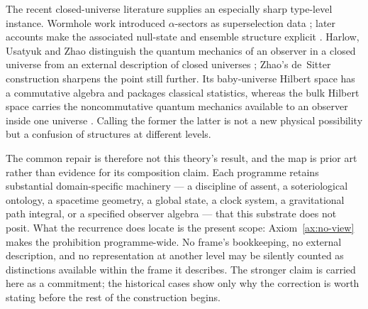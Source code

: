 \documentclass[11pt,a4paper]{article}
\theoremstyle{remark}\newtheorem{remark}[definition]{Remark}
\begin{document}
The recent closed-universe literature supplies an especially sharp type-level instance. Wormhole work introduced $\alpha$-sectors as superselection data \citep{coleman1988,giddingsstrominger1988}; later accounts make the associated null-state and ensemble structure explicit \citep{marolfmaxfield2020}. Harlow, Usatyuk and Zhao distinguish the quantum mechanics of an observer in a closed universe from an external description of closed universes \citep{harlowusatyukzhao2025}; Zhao's de~Sitter construction sharpens the point still further. Its baby-universe Hilbert space has a commutative algebra and packages classical statistics, whereas the bulk Hilbert space carries the noncommutative quantum mechanics available to an observer inside one universe \citep{zhao2026}. Calling the former the latter is not a new physical possibility but a confusion of structures at different levels.

The common repair is therefore not this theory's result, and the map is prior art rather than evidence for its composition claim. Each programme retains substantial domain-specific machinery --- a discipline of assent, a soteriological ontology, a spacetime geometry, a global state, a clock system, a gravitational path integral, or a specified observer algebra --- that this substrate does not posit. What the recurrence does locate is the present scope: Axiom~\ref{ax:no-view} makes the prohibition programme-wide. No frame's bookkeeping, no external description, and no representation at another level may be silently counted as distinctions available within the frame it describes. The stronger claim is carried here as a commitment; the historical cases show only why the correction is worth stating before the rest of the construction begins.
\end{document}
